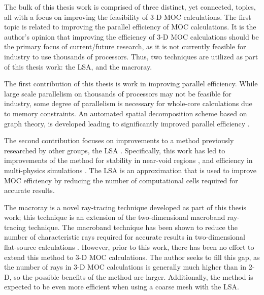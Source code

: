 {{    The bulk of this thesis work is comprised of three distinct, yet connected, topics, all with a focus on improving the feasibility of 3-D \ac{MOC} calculations.
    The first topic is related to improving the parallel efficiency of \ac{MOC} calculations.
    It is the author's opinion that improving the efficiency of 3-D \ac{MOC} calculations should be the primary focus of current/future research, as it is not currently feasible for industry to use thousands of processors.
    Thus, two techniques are utilized as part of this thesis work: the \acf{LSA}, and the macroray.

    The first contribution of this thesis is work in improving parallel efficiency.
    While large scale parallelism on thousands of processors may not be feasible for industry, some degree of parallelism is necessary for whole-core calculations due to memory constraints.
    An automated spatial decomposition scheme based on graph theory, is developed leading to significantly improved parallel efficiency \cite{Fitzgerald2017,Fitzgerald2019a}.

    The second contribution focuses on improvements to a method previously researched by other groups, the \acf{LSA} \cite{Ferrer2016,Ferrer2018,Gunow2018}.
    Specifically, this work has led to improvements of the method for stability in near-void regions \cite{Fitzgerald2018}, and efficiency in multi-physics simulations \cite{Fitzgerald2019}.
    The \ac{LSA} is an approximation that is used to improve \ac{MOC} efficiency by reducing the number of computational cells required for accurate results.

    The macroray is a novel ray-tracing technique developed as part of this thesis work; this technique is an extension of the two-dimensional macroband \cite{Villarino1992} ray-tracing technique.
    The macroband technique has been shown to reduce the number of characteristic rays required for accurate results in two-dimensional flat-source calculations \cite{Yamamoto2005,Fevotte2007}.
    However, prior to this work, there has been no effort to extend this method to 3-D \ac{MOC} calculations.
    The author seeks to fill this gap, as the number of rays in 3-D \ac{MOC} calculations is generally much higher than in 2-D, so the possible benefits of the method are larger.
    Additionally, the method is expected to be even more efficient when using a coarse mesh with the \ac{LSA}.
  }
}
